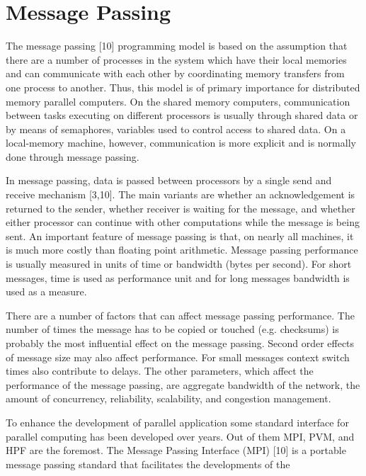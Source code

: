 \section{Message Passing}
The message passing [10] programming model is based on the assumption that there are a number of processes in the system which have their local memories and
can communicate with each other by coordinating memory transfers from one process to another. Thus, this model is of primary importance for distributed memory
parallel computers. On the shared memory computers, communication between tasks executing on different processors is usually through shared data or
by means of semaphores, variables used to control access to shared data. On a local-memory machine, however, communication is more explicit and is
normally done through message passing. \par
\hspace{1in} In message passing, data is passed between processors by a single send and receive mechanism [3,10]. The main variants are whether an
acknowledgement is returned to the sender, whether receiver is waiting for the message, and whether either processor can continue with other computations while
the message is
being sent. An important feature of message passing is that, on nearly all machines, it is much more costly than floating point arithmetic. Message passing
performance is usually measured in units of time or bandwidth (bytes per second). For short messages, time is used as performance unit and for long messages
bandwidth is used as a measure. \par
\hspace{1in} There are a number of factors that can affect message passing performance. The number of times the message has to be copied or touched (e.g.
checksums) is probably the most influential effect on the message passing. Second order effects of message size may also affect performance. For small
messages context switch times also contribute to delays. The other parameters, which affect the performance of the message passing, are
aggregate bandwidth of the network, the amount of concurrency, reliability, scalability, and congestion management.\par
\hspace{1in} To enhance the development of parallel application some standard interface for parallel computing has been developed over years. Out of them
MPI, PVM, and HPF are the foremost. The Message Passing Interface (MPI) [10] is a portable message passing standard that facilitates the developments of the
